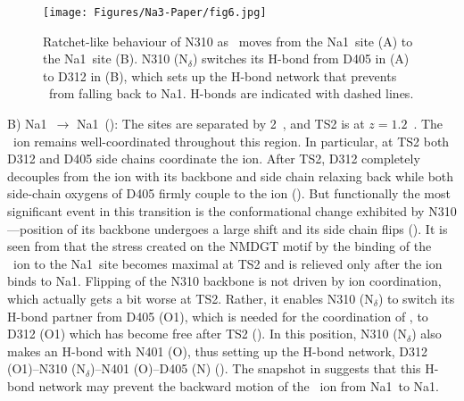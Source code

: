 \begin{figure}[b!]
\centering
 \texttt{[image: Figures/Na3-Paper/fig6.jpg]}
 \caption{Ratchet-like behaviour of N310 as \Na\ moves from the Na1\prim\ site 
          (A) to the Na1\dprim\ site (B). N310 (N$_{\delta}$) switches its H-bond 
          from D405 in (A) to D312 in (B), which sets up the H-bond network that 
          prevents \Na\ from falling back to Na1\prim. H-bonds are indicated with 
          dashed lines.}
\label{na3:fig6}
\end{figure}

B) Na1\prim\ $\rightarrow$ Na1\dprim\ (): The sites are separated by 2~\angs, 
and TS2 is at $z=1.2$~\angs. The \Na\ ion remains well-coordinated throughout this region. In 
particular, at TS2 both D312 and D405 side chains coordinate the ion. After TS2, D312 completely 
decouples from the ion with its backbone and side chain relaxing back while both side-chain oxygens 
of D405 firmly couple to the ion (). But functionally the most significant 
event in this transition is the conformational change exhibited by N310---position of its backbone 
undergoes a large shift and its side chain flips (). It is 
seen from  that the stress created on the NMDGT motif by the binding of the \Na\ 
ion to the Na1\prim\ site becomes maximal at TS2 and is relieved only after the ion binds to Na1\dprim. 
Flipping of the N310 backbone is not driven by ion coordination, which actually gets a bit worse at 
TS2. Rather, it enables N310 (N$_{\delta}$) to switch its H-bond partner from D405 (O1), which is 
needed for the coordination of \Na, to D312 (O1) which has become free after TS2 (). 
In this position, N310 (N$_{\delta}$) also makes an H-bond with N401 (O), thus setting up the H-bond 
network, D312 (O1)--N310 (N$_{\delta}$)--N401 (O)--D405 (N) (\figrefn{na3:fig6}{A{\color{black}--}B}). 
The snapshot in \figrefi{na3:fig6}{B} suggests that this H-bond network may prevent the backward motion 
of the \Na\ ion from Na1\dprim\ to Na1\prim. 

